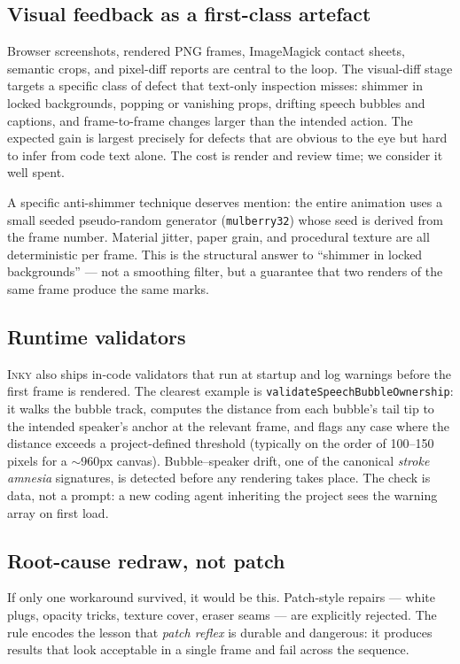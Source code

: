 \documentclass[10pt,twocolumn]{article}
\newcommand{\term}[1]{\textit{#1}}
\newcommand{\inky}{\textsc{Inky}}
\begin{document}
\subsection{Visual feedback as a first-class artefact}

Browser screenshots, rendered PNG frames, ImageMagick contact
sheets, semantic crops, and pixel-diff reports are central to the
loop. The visual-diff stage targets a specific class of defect that
text-only inspection misses: shimmer in locked backgrounds, popping
or vanishing props, drifting speech bubbles and captions, and
frame-to-frame changes larger than the intended action. The
expected gain is largest precisely for defects that are obvious to
the eye but hard to infer from code text alone. The cost is render
and review time; we consider it well spent.

A specific anti-shimmer technique deserves mention: the entire
animation uses a small seeded pseudo-random generator
(\texttt{mulberry32}) whose seed is derived from the frame number.
Material jitter, paper grain, and procedural texture are all
deterministic per frame. This is the structural answer to
``shimmer in locked backgrounds'' --- not a smoothing filter, but a
guarantee that two renders of the same frame produce the same
marks.

\subsection{Runtime validators}

\inky{} also ships in-code validators that run at startup and log
warnings before the first frame is rendered. The clearest example
is \texttt{validateSpeechBubbleOwnership}: it walks the bubble
track, computes the distance from each bubble's tail tip to the
intended speaker's anchor at the relevant frame, and flags any
case where the distance exceeds a project-defined threshold
(typically on the order of 100--150 pixels for a $\sim$960px
canvas). Bubble--speaker drift, one of
the canonical \term{stroke amnesia} signatures, is detected
before any rendering takes place. The check is data, not a
prompt: a new coding agent inheriting the project sees the
warning array on first load.

\subsection{Root-cause redraw, not patch}

If only one workaround survived, it would be this. Patch-style
repairs --- white plugs, opacity tricks, texture cover, eraser seams
--- are explicitly rejected. The rule encodes the lesson that
\term{patch reflex} is durable and dangerous: it produces results
that look acceptable in a single frame and fail across the sequence.
\end{document}
